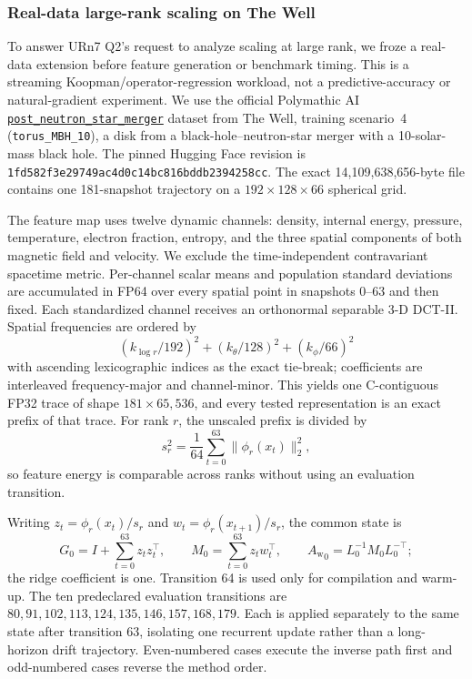 \documentclass[11pt]{article}
\newcommand{\Aw}{A_{\mathrm w}}
\begin{document}
\subsubsection{Real-data large-rank scaling on The Well}
\label{sec:e5-blackhole}

To answer URn7 Q2's request to analyze scaling at large rank, we froze a
real-data extension before feature generation or benchmark timing.  This is a
streaming Koopman/operator-regression workload, not a predictive-accuracy or
natural-gradient experiment.  We use the official Polymathic AI
\href{https://huggingface.co/datasets/polymathic-ai/post_neutron_star_merger}%
{\texttt{post\_neutron\_star\_merger}} dataset from The Well, training
scenario~4 (\texttt{torus\_MBH\_10}), a disk from a black-hole--neutron-star
merger with a 10-solar-mass black hole.  The pinned Hugging Face revision is
\texttt{1fd582f3e29749ac4d0c14bc816bddb2394258cc}.  The exact
14,109,638,656-byte file contains one 181-snapshot trajectory on a
\(192\times128\times66\) spherical grid.

The feature map uses twelve dynamic channels: density, internal energy,
pressure, temperature, electron fraction, entropy, and the three spatial
components of both magnetic field and velocity.  We exclude the
time-independent contravariant spacetime metric.  Per-channel scalar means
and population standard deviations are accumulated in FP64 over every
spatial point in snapshots 0--63 and then fixed.  Each standardized channel
receives an orthonormal separable 3-D DCT-II.  Spatial frequencies are ordered
by
\[
 (k_{\log r}/192)^2+(k_\theta/128)^2+(k_\phi/66)^2
\]
with ascending lexicographic indices as the exact tie-break; coefficients are
interleaved frequency-major and channel-minor.  This yields one C-contiguous
FP32 trace of shape \(181\times65{,}536\), and every tested representation is
an exact prefix of that trace.  For rank \(r\), the unscaled prefix is divided
by
\[
 s_r^2=\frac1{64}\sum_{t=0}^{63}\|\phi_r(x_t)\|_2^2 ,
\]
so feature energy is comparable across ranks without using an evaluation
transition.

Writing \(z_t=\phi_r(x_t)/s_r\) and
\(w_t=\phi_r(x_{t+1})/s_r\), the common state is
\[
 G_0=I+\sum_{t=0}^{63}z_tz_t^\top,\qquad
 M_0=\sum_{t=0}^{63}z_tw_t^\top,\qquad
 {\Aw}_0=L_0^{-1}M_0L_0^{-\top};
\]
the ridge coefficient is one.  Transition 64 is used only for compilation
and warm-up.  The ten predeclared evaluation transitions are
\(80,91,102,113,124,135,146,157,168,179\).  Each is applied separately to
the same state after transition 63, isolating one recurrent update rather
than a long-horizon drift trajectory.  Even-numbered cases execute the
inverse path first and odd-numbered cases reverse the method order.
\end{document}

